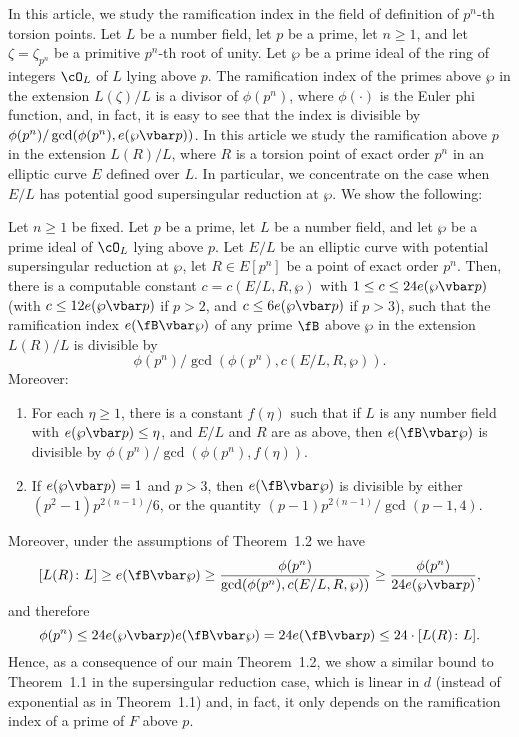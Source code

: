 In this article, we study the ramification index in the field of definition of $p^n$-th torsion points. Let $L$ be a number field, let $p$ be a prime, let $n \geq 1$, and let $\zeta = \zeta_{p^n}$ be a primitive $p^n$-th root of unity. Let $\wp$ be a prime ideal of the ring of integers $\cO_L$ of $L$ lying above $p$. The ramification index of the primes above $\wp$ in the extension $L(\zeta)/L$ is a divisor of $\phi(p^n)$, where $\phi(\cdot)$ is the Euler phi function, and, in fact, it is easy to see that the index is divisible by $\phi(p^n) / \gcd(\phi(p^n), e(\wp \vbar p))$. In this article we study the ramification above $p$ in the extension $L(R)/L$, where $R$ is a torsion point of exact order $p^n$ in an elliptic curve $E$ defined over $L$. In particular, we concentrate on the case when $E/L$ has potential good supersingular reduction at $\wp$. We show the following:


\begin{thm} %
Let $n \geq 1$ be fixed. Let $p$ be a prime, let $L$ be a number field, and let $\wp$ be a prime ideal of $\cO_L$ lying above $p$. Let $E/L$ be an elliptic curve with potential supersingular reduction at $\wp$, let $R \in E[p^n]$ be a point of exact order $p^n$. Then, there is a computable constant $c= c(E/L, R, \wp)$ with $1 \leq c \leq 24 e(\wp \vbar p)$ (with $c \leq 12 e(\wp \vbar p)$ if $p > 2$, and $c \leq 6 e(\wp \vbar p)$ if $p > 3$), such that the ramification index $e(\fB \vbar \wp)$ of any prime $\fB$ above $\wp$ in the extension $L(R)/L$ is divisible by
	\[
	\phi(p^n) / \gcd( \phi(p^n), c(E/L, R, \wp)).
	\]
Moreover:
	\begin{enumerate}[(1)]
	\item For each $\eta \geq 1$, there is a constant $f(\eta)$ such that if $L$ is any number field with $e(\wp \vbar p) \leq \eta$, and $E/L$ and $R$ are as above, then $e(\fB \vbar \wp)$ is divisible by $\phi(p^n) / \gcd(\phi(p^n), f(\eta))$. 
	\item If $e(\wp \vbar p)= 1$ and $p > 3$, then $e(\fB \vbar \wp)$ is divisible by either $(p^2 - 1) p^{2(n-1)}/6$, or the quantity $(p - 1)p^{2(n-1)} / \gcd(p - 1,4)$. 
	\end{enumerate}
\end{thm}


Moreover, under the assumptions of Theorem~1.2 we have
	\[
	[L(R) \colon L] \geq e(\fB \vbar \wp) \geq \dfrac{\phi(p^n)}{\gcd(\phi(p^n), c(E/L, R, \wp))} \geq \dfrac{\phi(p^n)}{24 e(\wp \vbar p)},
	\]
and therefore
	\[
	\phi(p^n) \leq 24e(\wp \vbar p) e(\fB \vbar \wp)= 24e(\fB \vbar p) \leq 24 \cdot [L(R) \colon L].
	\]
Hence, as a consequence of our main Theorem~1.2, we show a similar bound to Theorem~1.1 in the supersingular reduction case, which is linear in $d$ (instead of exponential as in Theorem~1.1) and, in fact, it only depends on the ramification index of a prime of $F$ above $p$.


